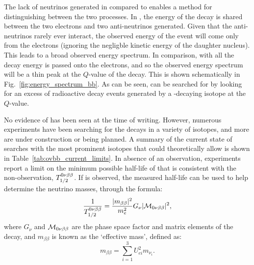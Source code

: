 The lack of neutrinos generated in \onbb{} compared to \twonbb{} enables a method for distinguishing between the two processes. In \twonbb{}, the energy of the decay is shared between the two electrons and two anti-neutrinos generated. Given that the anti-neutrinos rarely ever interact, the observed energy of the event will come only from the electrons (ignoring the negligble kinetic energy of the daughter nucleus). This leads to a broad observed energy spectrum. In comparison, with \onbb{} all the decay energy is passed onto the electrons, and so the observed energy spectrum will be a thin peak at the $Q$-value of the decay. This is shown schematically in Fig.~\ref{fig:energy_spectrum_bb}. As can be seen, \onbb{} can be searched for by looking for an excess of radioactive decay events generated by a \twonbb{}-decaying isotope at the $Q$-value.

No evidence of \onbb{} has been seen at the time of writing. However, numerous experiments have been searching for the decays in a variety of isotopes, and more are under construction or being planned. A summary of the current state of searches with the most prominent isotopes that could theoretically allow \onbb{} is shown in Table~\ref{tab:ovbb_current_limits}. In absence of an observation, experiments report a limit on the minimum possible half-life of \onbb{} that is consistent with the non-observation, $T_{1/2}^{0\nu\beta\beta{}}$. If \onbb{} is observed, the measured half-life can be used to help determine the neutrino masses, through the formula:
\begin{equation}
    \frac{1}{T_{1/2}^{0\nu\beta\beta{}}} = \frac{ |m_{\beta\beta}|^{2}}{m_{e}^{2}}G_{\nu}|\mathcal{M}_{0\nu\beta\beta{}}|^{2},
\end{equation}
where $G_{\nu}$ and $\mathcal{M}_{0\nu\beta\beta{}}$ are the phase space factor and matrix elements of the decay, and $m_{\beta\beta}$ is known as the `effective \onbb{} mass', defined as:
\begin{equation}
    m_{\beta\beta} = \sum_{i=1}^{3}U_{ei}^2m_{\nu_{i}}.
\end{equation}

